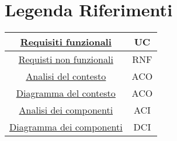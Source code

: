 \section{Legenda Riferimenti}
\label{secD2:LegendaRiferimenti}

\begin{tabular}{|c|c|}
    \hline
    \hyperref[secD2:RequisitiFunzionali]{Requisiti funzionali} & UC\\
    \hline
    \hyperref[secD2:RequisitiNonFunzionali]{Requisti non funzionali} & RNF\\
    \hline
    \hyperref[secD2:AnalisiDelContesto]{Analisi del contesto} & ACO\\
    \hline
    \hyperref[secD2:DiagrammaContesto]{Diagramma del contesto} & ACO\\
    \hline
    \hyperref[secD2:AnalisiDeiComponenti]{Analisi dei componenti} & ACI\\
    \hline
    \hyperref[secD2:DiagrammaComponenti]{Diagramma dei componenti} & DCI\\
    \hline
\end{tabular}